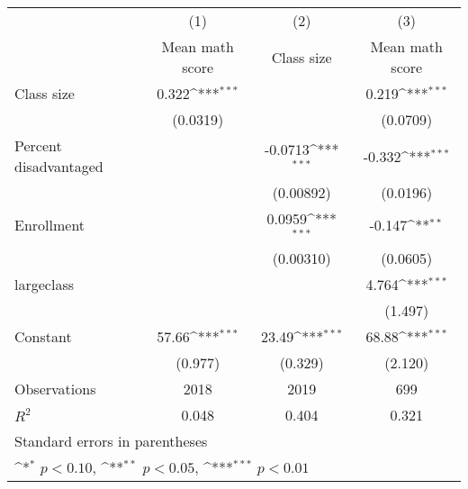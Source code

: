 {
\def\sym#1{\ifmmode^{#1}\else\(^{#1}\)\fi}
\begin{tabular}{l*{3}{c}}
\hline\hline
                    &\multicolumn{1}{c}{(1)}&\multicolumn{1}{c}{(2)}&\multicolumn{1}{c}{(3)}\\
                    &\multicolumn{1}{c}{Mean math score}&\multicolumn{1}{c}{Class size}&\multicolumn{1}{c}{Mean math score}\\
\hline
Class size          &       0.322\sym{***}&                     &       0.219\sym{***}\\
                    &    (0.0319)         &                     &    (0.0709)         \\
[1em]
Percent disadvantaged&                     &     -0.0713\sym{***}&      -0.332\sym{***}\\
                    &                     &   (0.00892)         &    (0.0196)         \\
[1em]
Enrollment          &                     &      0.0959\sym{***}&      -0.147\sym{**} \\
                    &                     &   (0.00310)         &    (0.0605)         \\
[1em]
largeclass          &                     &                     &       4.764\sym{***}\\
                    &                     &                     &     (1.497)         \\
[1em]
Constant            &       57.66\sym{***}&       23.49\sym{***}&       68.88\sym{***}\\
                    &     (0.977)         &     (0.329)         &     (2.120)         \\
\hline
Observations        &        2018         &        2019         &         699         \\
\(R^{2}\)           &       0.048         &       0.404         &       0.321         \\
\hline\hline
\multicolumn{4}{l}{\footnotesize Standard errors in parentheses}\\
\multicolumn{4}{l}{\footnotesize \sym{*} \(p<0.10\), \sym{**} \(p<0.05\), \sym{***} \(p<0.01\)}\\
\end{tabular}
}
